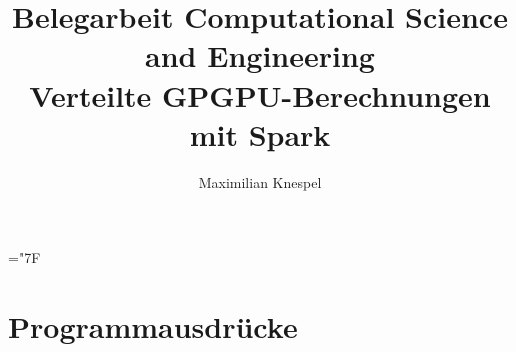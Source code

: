 \documentclass[german,bibnum,beleg,zihtitle,german,hyperref,utf8]{zihpub}
\author{Maximilian Knespel}
\title{Belegarbeit Computational Science and Engineering\\
       Verteilte GPGPU-Berechnungen mit Spark}
\date{}
\begin{document}
\hyphenchar\font=\string"7F %












\appendix




\chapter{Programmausdrücke}





\end{document}
